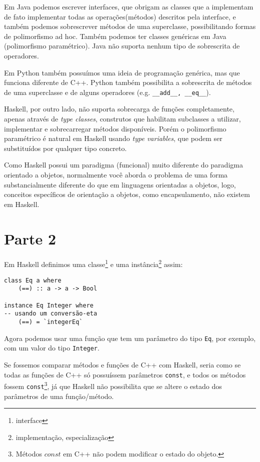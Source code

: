 \documentclass[a4paper,twocolumn,10pt]{article}
\begin{document}
Em Java podemos escrever interfaces, que obrigam as classes que a implementam
de fato implementar todas as operações(métodos) descritos pela interface, e
também podemos sobrescrever métodos de uma superclasse, possibilitando formas
de polimorfismo ad hoc. Também podemos ter classes genéricas em Java
(polimorfismo paramétrico). Java não suporta nenhum tipo de sobrescrita de
operadores.

Em Python também possuímos uma ideia de programação genérica, mas que funciona
diferente de C++. Python também possibilita a sobrescrita de métodos de uma
superclasse e de alguns operadores (e.g. \verb$__add__, __eq__$).

Haskell, por outro lado, não suporta sobrecarga de funções completamente,
apenas através de \textit{type classes}, construtos que habilitam subclasses a
utilizar, implementar e sobrecarregar métodos disponíveis. Porém o polimorfismo
paramétrico é natural em Haskell usando \textit{type variables}, que podem ser
substituídos por qualquer tipo concreto.

Como Haskell possui um paradigma (funcional) muito diferente do paradigma
orientado a objetos, normalmente você aborda o problema de uma forma
substancialmente diferente do que em linguagens orientadas a objetos, logo,
conceitos específicos de orientação a objetos, como encapsulamento, não existem
em Haskell.

\section*{Parte 2}

Em Haskell definimos uma classe\footnote{interface} e uma
instância\footnote{implementação, especialização} assim:

\begin{verbatim}
class Eq a where
    (==) :: a -> a -> Bool

instance Eq Integer where
-- usando um conversão-eta
    (==) = `integerEq`
\end{verbatim}

Agora podemos usar uma função que tem um parâmetro do tipo \verb$Eq$, por
exemplo, com um valor do tipo \verb$Integer$.

Se fossemos comparar métodos e funções de C++ com Haskell, seria como se todas
as funções de C++ só possuíssem parâmetros \verb$const$, e todos os métodos
fossem \verb$const$\footnote{Métodos $const$ em C++ não podem modificar o
estado do objeto.}, já que Haskell não possibilita que se altere o estado dos
parâmetros de uma função/método.
\end{document}
